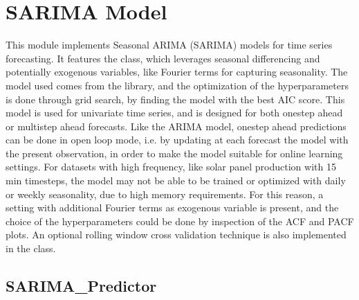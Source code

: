 \documentclass[letterpaper,10pt,english]{sphinxmanual}
\begin{document}
\section{SARIMA Model}
\label{\detokenize{docs/SARIMA_model:sarima-model}}\label{\detokenize{docs/SARIMA_model::doc}}
\sphinxAtStartPar
This module implements Seasonal ARIMA (SARIMA) models for time series forecasting.
It features the  class, which leverages seasonal differencing and potentially exogenous variables,
like Fourier terms for capturing seasonality.
The model used comes from the  library, and the optimization of the hyperparameters
is done through grid search, by finding the model with the best AIC score.
This model is used for univariate time series, and is designed for both one\sphinxhyphen{}step ahead or multi\sphinxhyphen{}step ahead forecasts.
Like the ARIMA model, one\sphinxhyphen{}step ahead predictions can be done in open loop mode, i.e. by updating at each forecast the
model with the present observation, in order to make the model suitable for online learning settings.
For datasets with high frequency, like solar panel production with 15 min timesteps, the model may
not be able to be trained or optimized with daily or weekly seasonality, due to high memory requirements.
For this reason, a setting with additional Fourier terms as exogenous variable is present, and the choice of the hyperparameters could be done
by inspection of the ACF and PACF plots.
An optional rolling window cross validation technique is also implemented in the class.


\subsection{SARIMA\_Predictor}
\label{\detokenize{docs/SARIMA_model:module-SARIMA_model}}\label{\detokenize{docs/SARIMA_model:sarima-predictor}}
\end{document}
